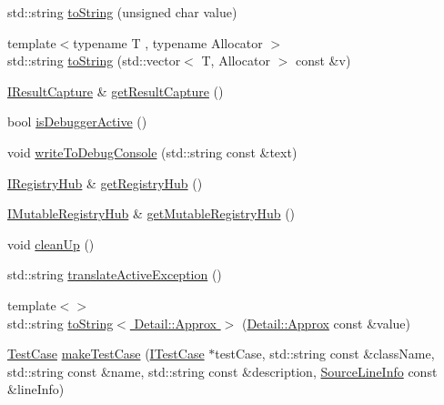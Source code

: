 \begin{DoxyCompactItemize}
\item 
std\-::string \hyperlink{namespace_catch_a5d83eaeb68579a556c86cc05f7a7765f}{to\-String} (unsigned char value)
\item 
{\footnotesize template$<$typename T , typename Allocator $>$ }\\std\-::string \hyperlink{namespace_catch_a2899237fef39daaae9a22e7846c0a9bf}{to\-String} (std\-::vector$<$ T, Allocator $>$ const \&v)
\item 
\hyperlink{struct_catch_1_1_i_result_capture}{I\-Result\-Capture} \& \hyperlink{namespace_catch_aff60c1de6ac6cea30175d70e33d83c8e}{get\-Result\-Capture} ()
\item 
bool \hyperlink{namespace_catch_ab079497368fb1df25af39ad494d2a241}{is\-Debugger\-Active} ()
\item 
void \hyperlink{namespace_catch_aa5dcf4750ce9a854f4b74d3c952d13cc}{write\-To\-Debug\-Console} (std\-::string const \&text)
\item 
\hyperlink{struct_catch_1_1_i_registry_hub}{I\-Registry\-Hub} \& \hyperlink{namespace_catch_ac24b072979540bfd922e7d46e899f46f}{get\-Registry\-Hub} ()
\item 
\hyperlink{struct_catch_1_1_i_mutable_registry_hub}{I\-Mutable\-Registry\-Hub} \& \hyperlink{namespace_catch_ac9ddcc6d66079add9cb2a3140b8ae51e}{get\-Mutable\-Registry\-Hub} ()
\item 
void \hyperlink{namespace_catch_a0f78e9afdebc6d4512d18e76fbf54b8c}{clean\-Up} ()
\item 
std\-::string \hyperlink{namespace_catch_adafff91485eeeeb9e9333f317cc0e3b1}{translate\-Active\-Exception} ()
\item 
{\footnotesize template$<$$>$ }\\std\-::string \hyperlink{namespace_catch_ac501c2b6bfe82978d699ddda37c53d13}{to\-String$<$ Detail\-::\-Approx $>$} (\hyperlink{class_catch_1_1_detail_1_1_approx}{Detail\-::\-Approx} const \&value)
\item 
\hyperlink{class_catch_1_1_test_case}{Test\-Case} \hyperlink{namespace_catch_a2a784590bb5068810d3f6013fed1f1d3}{make\-Test\-Case} (\hyperlink{struct_catch_1_1_i_test_case}{I\-Test\-Case} $\ast$test\-Case, std\-::string const \&class\-Name, std\-::string const \&name, std\-::string const \&description, \hyperlink{struct_catch_1_1_source_line_info}{Source\-Line\-Info} const \&line\-Info)
\end{DoxyCompactItemize}



